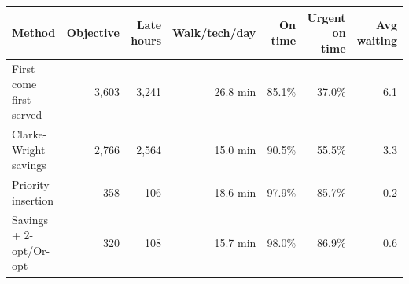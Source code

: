 \begin{tabular}{lrrrrrr}
\toprule
\textbf{Method} & \textbf{Objective} & \textbf{Late hours} & \textbf{Walk/tech/day} & \textbf{On time} & \textbf{Urgent on time} & \textbf{Avg waiting} \\
\midrule
First come first served & 3,603 & 3,241 & 26.8 min & 85.1\% & 37.0\% & 6.1 \\
Clarke-Wright savings & 2,766 & 2,564 & 15.0 min & 90.5\% & 55.5\% & 3.3 \\
Priority insertion & 358 & 106 & 18.6 min & 97.9\% & 85.7\% & 0.2 \\
Savings + 2-opt/Or-opt & 320 & 108 & 15.7 min & 98.0\% & 86.9\% & 0.6 \\
\bottomrule
\end{tabular}
